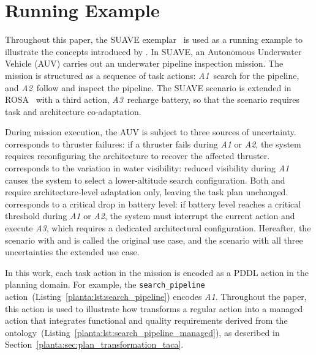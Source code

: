 \section{Running Example}\label{planta:sec:running_example}

Throughout this paper, the SUAVE exemplar~\cite{suave} is used as a running example to illustrate the concepts introduced by \planta. In SUAVE, an Autonomous Underwater Vehicle (AUV) carries out an underwater pipeline inspection mission. The mission is structured as a sequence of task actions: \emph{A1}~search for the pipeline, and \emph{A2}~follow and inspect the pipeline. The SUAVE scenario is extended in ROSA~\cite{rosa} with a third action, \emph{A3}~recharge battery, so that the scenario requires task and architecture co-adaptation.

During mission execution, the AUV is subject to three sources of uncertainty. \Uone corresponds to thruster failures: if a thruster fails during \emph{A1} or \emph{A2}, the system requires reconfiguring the architecture to recover the affected thruster. \Utwo corresponds to the variation in water visibility: reduced visibility during \emph{A1} causes the system to select a lower-altitude search configuration. Both \Uone and \Utwo require architecture-level adaptation only, leaving the task plan unchanged. \Uthree corresponds to a critical drop in battery level: if battery level reaches a critical threshold during \emph{A1} or \emph{A2}, the system must interrupt the current action and execute \emph{A3}, which requires a dedicated architectural configuration. Hereafter, the scenario with \Uone and \Utwo is called the original use case, and the scenario with all three uncertainties the extended use case. %

In this work, each task action in the mission is encoded as a PDDL action in the planning domain. For example, the \texttt{search\_pipeline} action~(Listing~\ref{planta:lst:search_pipeline}) encodes \emph{A1}. Throughout the paper, this action is used to illustrate how \planta transforms a regular action into a managed action that integrates functional and quality requirements derived from the \pddltomasys ontology~(Listing~\ref{planta:lst:search_pipeline_managed}), as described in Section~\ref{planta:sec:plan_transformation_taca}.

